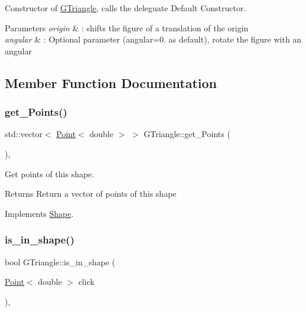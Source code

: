Constructor of \hyperlink{classGTriangle}{G\+Triangle}, calls the deleguate Default Constructor. 


\begin{DoxyParams}{Parameters}
{\em origin} & \+: shifts the figure of a translation of the origin \\
\hline
{\em angular} & \+: Optional parameter (angular=0. as default), rotate the figure with an angular \\
\hline
\end{DoxyParams}


\subsection{Member Function Documentation}
\mbox{\label{classGTriangle_add4581d1b52836142de5817de4d52d17}} 
\subsubsection{\texorpdfstring{get\+\_\+\+Points()}{get\_Points()}}
{\footnotesize\ttfamily std\+::vector$<$ \hyperlink{classPoint}{Point}$<$ double $>$ $>$ G\+Triangle\+::get\+\_\+\+Points (\begin{DoxyParamCaption}{ }\end{DoxyParamCaption})\hspace{0.3cm}{\ttfamily [override]}, {\ttfamily [virtual]}}



Get points of this shape. 

\begin{DoxyReturn}{Returns}
Return a vector of points of this shape 
\end{DoxyReturn}


Implements \hyperlink{classShape_add74a5c682840fa4a519242b1ddbd0b5}{Shape}.

\mbox{\label{classGTriangle_a7e5d4eefbb2e42b9c3142096a23dcb19}} 
\subsubsection{\texorpdfstring{is\+\_\+in\+\_\+shape()}{is\_in\_shape()}}
{\footnotesize\ttfamily bool G\+Triangle\+::is\+\_\+in\+\_\+shape (\begin{DoxyParamCaption}\item[{\hyperlink{classPoint}{Point}$<$ double $>$}]{click }\end{DoxyParamCaption})\hspace{0.3cm}{\ttfamily [override]}, {\ttfamily [virtual]}}



